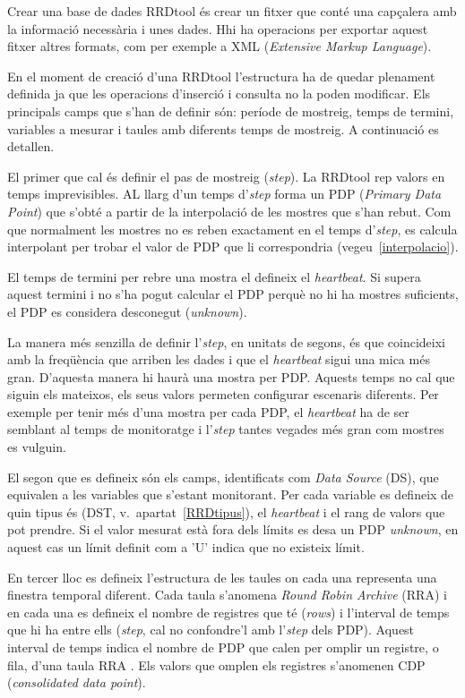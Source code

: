 Crear una base de dades RRDtool és crear un fitxer que conté una capçalera amb la informació necessària i unes dades. Hhi ha operacions per exportar aquest fitxer altres formats, com per exemple a XML (\emph{Extensive Markup Language}).

En el moment de creació d'una RRDtool l'estructura ha de quedar plenament definida ja que les operacions d'inserció i consulta no la poden modificar. Els principals camps que s'han de definir són: període de mostreig, temps de termini, variables a mesurar i taules amb diferents temps de mostreig. A continuació es detallen.
 

El primer que cal és definir el pas de mostreig (\emph{step}). La RRDtool rep valors en temps imprevisibles. AL llarg d'un temps d'\emph{step} forma un PDP (\emph{Primary Data Point}) que s'obté a partir de la interpolació de les mostres que s'han rebut. Com que normalment les mostres no es reben exactament en el temps d'\emph{step}, es calcula interpolant per trobar el valor de PDP que li correspondria (vegeu~\ref{interpolacio}). 

El temps de termini per rebre una mostra el defineix el \emph{heartbeat}. Si supera aquest termini i no s'ha pogut calcular el PDP perquè no hi ha mostres suficients, el PDP es considera desconegut  (\emph{unknown}).



La manera més senzilla de definir l'\emph{step}, en unitats de segons, és que coincideixi amb la freqüència que arriben les dades i que el \emph{heartbeat} sigui una mica més gran. D'aquesta manera hi haurà una mostra per PDP. Aquests temps no cal que siguin els mateixos, els seus valors permeten configurar escenaris diferents. Per exemple per tenir més d'una mostra per cada PDP, el \emph{heartbeat} ha de ser semblant al temps de monitoratge i l'\emph{step} tantes vegades més gran com mostres es vulguin.

El segon que es defineix són els camps, identificats com  \emph{Data Source} (DS), que equivalen a les variables que s'estant monitorant. Per cada variable es defineix de quin tipus és (DST, v.\ apartat~\ref{RRDtipus}), el \emph{heartbeat} i el rang de valors que pot prendre. Si el valor mesurat està fora dels límits es desa un PDP \emph{unknown}, en aquest cas un límit definit com a 'U' indica que no existeix límit.




En tercer lloc es defineix l'estructura de les taules on cada una representa una finestra temporal diferent. Cada taula s'anomena \emph{Round Robin Archive} (RRA) i en cada una es defineix el nombre de registres que té (\emph{rows}) i l'interval de temps que hi ha entre ells (\emph{step}, cal no confondre'l amb l'\emph{step} dels PDP). Aquest interval de temps indica el nombre de PDP que calen per omplir  un registre, o fila, d'una taula RRA . Els valors que omplen els registres s'anomenen CDP (\emph{consolidated data point}).  

